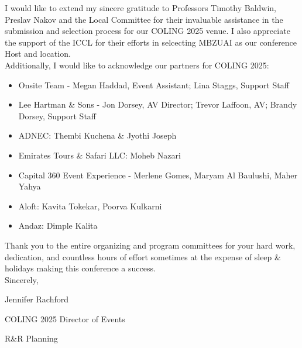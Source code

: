 I would like to extend my sincere gratitude to Professors Timothy Baldwin, Preslav Nakov and the Local Committee for their invaluable assistance in the submission and selection process for our COLING 2025 venue. I also appreciate the support of the ICCL for their efforts in selcecting MBZUAI as our conference Host and location. \\

Additionally, I would like to acknowledge our partners for COLING 2025:
\begin{itemize}[noitemsep]
    \item Onsite Team - Megan Haddad, Event Assistant; Lina Staggs, Support Staff 
    \item Lee Hartman \& Sons - Jon Dorsey, AV Director;  Trevor Laffoon, AV; Brandy Dorsey, Support Staff
    \item ADNEC: Thembi Kuchena \& Jyothi Joseph
    \item Emirates Tours \& Safari LLC: Moheb Nazari 
    \item Capital 360 Event Experience -  Merlene Gomes, Maryam Al Baulushi, Maher Yahya 
    \item Aloft: Kavita Tokekar, Poorva Kulkarni
    \item Andaz: Dimple Kalita 
\end{itemize}

Thank you to the entire organizing and program committees for your hard work, dedication, and countless hours of effort sometimes at the expense of sleep \& holidays making this conference a success. \\

Sincerely,

Jennifer Rachford 

COLING 2025 Director of Events

R\&R Planning 
